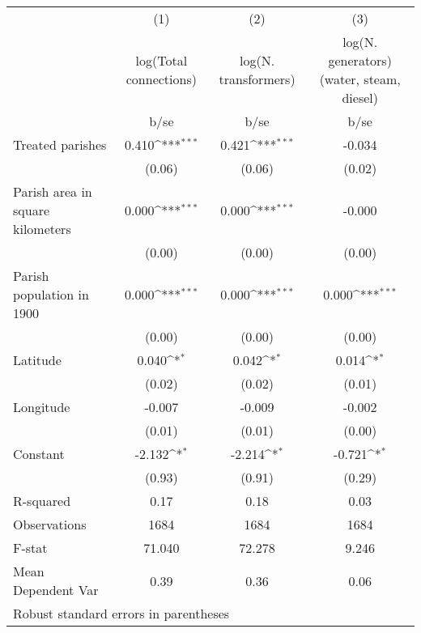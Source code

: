 {
\def\sym#1{\ifmmode^{#1}\else\(^{#1}\)\fi}
\begin{tabular}{l*{3}{c}}
\hline\hline
                    &\multicolumn{1}{c}{(1)}         &\multicolumn{1}{c}{(2)}         &\multicolumn{1}{c}{(3)}         \\
                    &log(Total connections)         &log(N. transformers)         &log(N. generators) (water, steam, diesel)         \\
                    &        b/se         &        b/se         &        b/se         \\
\hline
Treated parishes    &       0.410\sym{***}&       0.421\sym{***}&      -0.034         \\
                    &      (0.06)         &      (0.06)         &      (0.02)         \\
Parish area in square kilometers&       0.000\sym{***}&       0.000\sym{***}&      -0.000         \\
                    &      (0.00)         &      (0.00)         &      (0.00)         \\
Parish population in 1900&       0.000\sym{***}&       0.000\sym{***}&       0.000\sym{***}\\
                    &      (0.00)         &      (0.00)         &      (0.00)         \\
Latitude            &       0.040\sym{*}  &       0.042\sym{*}  &       0.014\sym{*}  \\
                    &      (0.02)         &      (0.02)         &      (0.01)         \\
Longitude           &      -0.007         &      -0.009         &      -0.002         \\
                    &      (0.01)         &      (0.01)         &      (0.00)         \\
Constant            &      -2.132\sym{*}  &      -2.214\sym{*}  &      -0.721\sym{*}  \\
                    &      (0.93)         &      (0.91)         &      (0.29)         \\
\hline
R-squared           &        0.17         &        0.18         &        0.03         \\
Observations        &        1684         &        1684         &        1684         \\
F-stat              &      71.040         &      72.278         &       9.246         \\
Mean Dependent Var  &        0.39         &        0.36         &        0.06         \\
\hline\hline
\multicolumn{4}{l}{\footnotesize Robust standard errors in parentheses}\\
\end{tabular}
}
